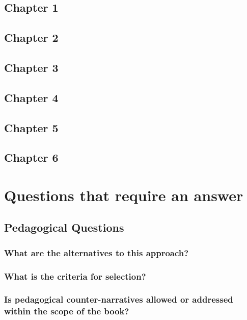 \documentclass[12pt]{article}
\begin{document}
	\subsection{Chapter 1}
	\subsection{Chapter 2}
	\subsection{Chapter 3}
	\subsection{Chapter 4}
	\subsection{Chapter 5}
	\subsection{Chapter 6}

	\section{Questions that require an answer}
	\subsection{Pedagogical Questions}
	\subsubsection{What are the alternatives to this approach?}
	\subsubsection{What is the criteria for selection?}
	\subsubsection{Is pedagogical counter-narratives allowed or addressed within the scope of the book?}
\end{document}
